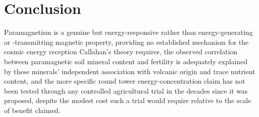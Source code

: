 \documentclass[11pt]{article}
\begin{document}
\section{Conclusion}

Paramagnetism is a genuine but energy-responsive rather than energy-generating or -transmitting magnetic property, providing no established mechanism for the cosmic energy reception Callahan's theory requires, the observed correlation between paramagnetic soil mineral content and fertility is adequately explained by these minerals' independent association with volcanic origin and trace nutrient content, and the more specific round tower energy-concentration claim has not been tested through any controlled agricultural trial in the decades since it was proposed, despite the modest cost such a trial would require relative to the scale of benefit claimed.
\end{document}

